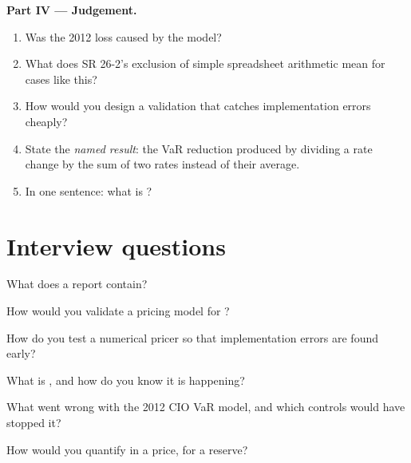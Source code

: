 \begin{problem}
\medskip\noindent\textbf{Part IV --- Judgement.}
\begin{enumerate}[resume]
\item Was the 2012 loss caused by the model?
\item What does SR 26-2's exclusion of simple spreadsheet arithmetic mean for cases like this?
\item How would you design a validation that catches implementation errors cheaply?
\item State the \emph{named result}: the VaR reduction produced by dividing a rate change by the sum of
two rates instead of their average.
\item In one sentence: what is ?
\end{enumerate}
\end{problem}

\section{Interview questions}

\begin{interviewq}\label{iq:rc:model-risk-and-validation:1}
What does a  report contain?
\end{interviewq}

\begin{interviewq}\label{iq:rc:model-risk-and-validation:2}
How would you validate a pricing model for ?
\end{interviewq}

\begin{interviewq}\label{iq:rc:model-risk-and-validation:3}
How do you test a numerical pricer so that implementation errors are found early?
\end{interviewq}

\begin{interviewq}\label{iq:rc:model-risk-and-validation:4}
What is , and how do you know it is happening?
\end{interviewq}

\begin{interviewq}\label{iq:rc:model-risk-and-validation:5}
What went wrong with the 2012 CIO VaR model, and which controls would have stopped it?
\end{interviewq}

\begin{interviewq}\label{iq:rc:model-risk-and-validation:6}
How would you quantify  in a price, for a reserve?
\end{interviewq}

